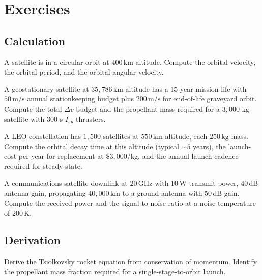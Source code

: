\section{Exercises}

\subsection*{Calculation}

\begin{exercise}
A satellite is in a circular orbit at $400\,\text{km}$ altitude. Compute the orbital velocity, the orbital period, and the orbital angular velocity.
\end{exercise}

\begin{exercise}
A geostationary satellite at $35{,}786\,\text{km}$ altitude has a $15$-year mission life with $50\,\text{m/s}$ annual stationkeeping budget plus $200\,\text{m/s}$ for end-of-life graveyard orbit. Compute the total $\Delta v$ budget and the propellant mass required for a $3{,}000$-kg satellite with $300$-s $I_{sp}$ thrusters.
\end{exercise}

\begin{exercise}
A LEO constellation has $1{,}500$ satellites at $550\,\text{km}$ altitude, each $250\,\text{kg}$ mass. Compute the orbital decay time at this altitude (typical $\sim 5$ years), the launch-cost-per-year for replacement at $\$3{,}000$/kg, and the annual launch cadence required for steady-state.
\end{exercise}

\begin{exercise}
A communications-satellite downlink at $20\,\text{GHz}$ with $10\,\text{W}$ transmit power, $40\,\text{dB}$ antenna gain, propagating $40{,}000\,\text{km}$ to a ground antenna with $50\,\text{dB}$ gain. Compute the received power and the signal-to-noise ratio at a noise temperature of $200\,\text{K}$.
\end{exercise}

\subsection*{Derivation}

\begin{exercise}
Derive the Tsiolkovsky rocket equation from conservation of momentum. Identify the propellant mass fraction required for a single-stage-to-orbit launch.
\end{exercise}

